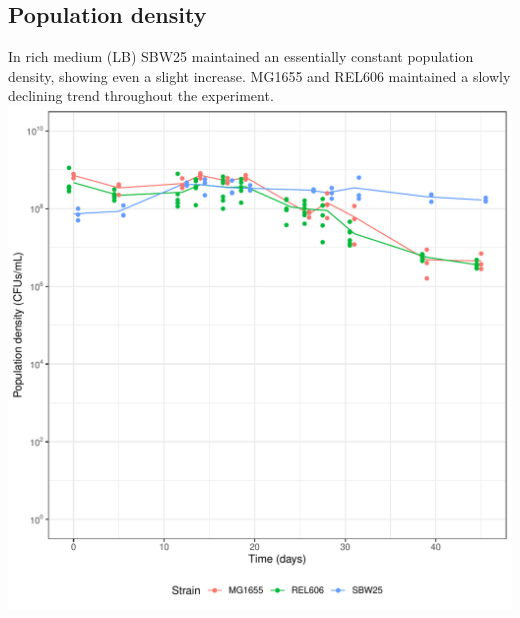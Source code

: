 \documentclass[
	11pt,
	a4paper,
]{article} %
\begin{document}
\begin{multicols}{2}
\subsection*{Population density}
In rich medium (LB) SBW25 maintained an essentially constant population density, showing even a slight increase.
MG1655 and REL606 maintained a slowly declining trend throughout the experiment.
\\[2ex]
\includegraphics[width=\columnwidth]{mean_plot_LB.pdf}
\vspace{2ex}


\end{multicols}
\end{document}

